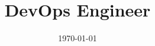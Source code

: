 \documentclass[11pt,a4]{moderncv}
\date{\today}
\title{DevOps Engineer}
\begin{document}
\makecvtitle










\end{document}
